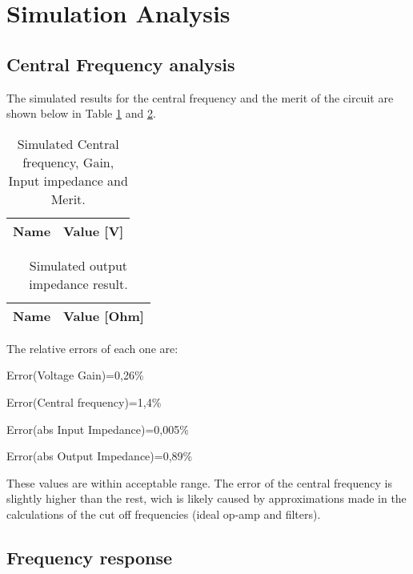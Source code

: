 \section{Simulation Analysis}
\label{sec:simulation}

\subsection{Central Frequency analysis}
The simulated results for the central frequency and the merit of the circuit are shown below in Table \ref{tab:sim_cf} and \ref{tab:sim_outimp}.


\begin{table}[h]
  \centering
  \begin{tabular}{|l|r|}
    \hline    
    {\bf Name} & {\bf Value [V]} \\ \hline
    
  \end{tabular}
  \caption{Simulated Central frequency, Gain, Input impedance and Merit.  }
  
  \label{tab:sim_cf}
\end{table}


\begin{table}[h]
  \centering
  \begin{tabular}{|l|r|}
    \hline    
    {\bf Name} & {\bf Value [Ohm]} \\ \hline
    
  \end{tabular}
  \caption{Simulated output impedance result. }
  
  \label{tab:sim_outimp}
\end{table}

The relative errors of each one are:

Error(Voltage Gain)=0,26\%

Error(Central frequency)=1,4\%

Error(abs Input Impedance)=0,005\%

Error(abs Output Impedance)=0,89\%

These values are within acceptable range. The error of the central frequency is slightly higher than the rest, wich is likely caused by approximations made in the calculations of the cut off frequencies (ideal op-amp and filters).



\subsection{Frequency response}

